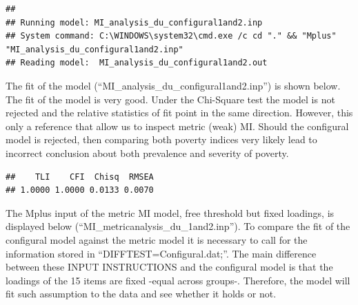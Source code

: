 \documentclass[]{book}
\newenvironment{Shaded}{\begin{snugshade}}{\end{snugshade}}
\newcommand{\DataTypeTok}[1]{\textcolor[rgb]{0.13,0.29,0.53}{#1}}
\newcommand{\KeywordTok}[1]{\textcolor[rgb]{0.13,0.29,0.53}{\textbf{#1}}}
\newcommand{\NormalTok}[1]{#1}
\newcommand{\OperatorTok}[1]{\textcolor[rgb]{0.81,0.36,0.00}{\textbf{#1}}}
\begin{document}
\begin{verbatim}
## 
## Running model: MI_analysis_du_configural1and2.inp 
## System command: C:\WINDOWS\system32\cmd.exe /c cd "." && "Mplus" "MI_analysis_du_configural1and2.inp" 
## Reading model:  MI_analysis_du_configural1and2.out
\end{verbatim}

The fit of the model (``MI\_analysis\_du\_configural1and2.inp'') is shown below. The fit of the model is very good. Under the Chi-Square test the model is not rejected and the relative statistics of fit point in the same direction. However, this only a reference that allow us to inspect metric (weak) MI. Should the configural model is rejected, then comparing both poverty indices very likely lead to incorrect conclusion about both prevalence and severity of poverty.

\begin{Shaded}
\end{Shaded}

\begin{verbatim}
##    TLI    CFI  Chisq  RMSEA 
## 1.0000 1.0000 0.0133 0.0070
\end{verbatim}

The Mplus input of the metric MI model, free threshold but fixed loadings, is displayed below (``MI\_metricanalysis\_du\_1and2.inp''). To compare the fit of the configural model against the metric model it is necessary to call for the information stored in ``DIFFTEST=Configural.dat;''. The main difference between these INPUT INSTRUCTIONS and the configural model is that the loadings of the 15 items are fixed -equal across groups-. Therefore, the model will fit such assumption to the data and see whether it holds or not.
\end{document}
